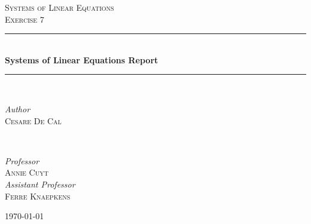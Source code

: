 \documentclass{article}
\begin{document}

\begin{titlepage} %
	\newcommand{\HRule}{\rule{\linewidth}{0.5mm}}%
	
	\center %
	
	
	\textsc{\Large Systems of Linear Equations}\\[0.5cm] %
	
	\textsc{\large Exercise 7}\\[0.5cm] %
	
	
	\HRule\\[0.6cm]
	
	{\huge\bfseries Systems of Linear Equations Report}\\[0.25cm] %
	
	\HRule\\[1.5cm]
	
	
	\begin{minipage}{0.4\textwidth}
		\begin{flushleft}
			\large
			\textit{Author}\\
			\textsc{Cesare De Cal} %
		\end{flushleft}
	\end{minipage}
	~
	\begin{minipage}{0.4\textwidth}
		\begin{flushright}
			\large
			\textit{Professor}\\
			\textsc{Annie Cuyt}\\ %
			[0.25cm]
			\textit{Assistant Professor}\\
			\textsc{Ferre Knaepkens} %

		\end{flushright}
	\end{minipage}
		
	\vfill\vfill\vfill
	
	{\large\today}
		
	\vfill
	
\end{titlepage}
\end{document}
